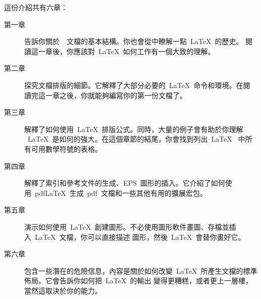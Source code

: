 \bigskip
\noindent 這份介紹共有六章：%
\begin{description}%
\item[第一章] 告訴你關於~\LaTeXe{}~文檔的基本結構。你也會從中瞭解一點~\LaTeX{}~的歷史。
              閱讀這一章後，你應該對~\LaTeX{}~如何工作有一個大致的理解。
\item[第二章] 探究文檔排版的細節。它解釋了大部分必要的~\LaTeX{}~命令和環境。在閱
              讀完這一章之後，你就能夠編寫你的第一份文檔了。%
\item[第三章] 解釋了如何使用~\LaTeX{}~排版公式。同時，大量的例子會有助於你理解
              ~\LaTeX{}~是如何的強大。在這個章節的結尾，你會找到列出~\LaTeX{}~
              中所有可用數學符號的表格。%
\item[第四章] 解釋了索引和參考文件的生成、EPS~圖形的插入。它介紹了如何使用~pdf\LaTeX{}~生成~pdf~文檔和一些其他有用的擴展宏包。%
\item[第五章] 演示如何使用~\LaTeX{}~創建圖形。不必使用圖形軟件畫圖、存檔並插入~\LaTeX{}~文檔，你可以直接描述
              圖形，然後~\LaTeX{}~會替你畫好它。
\item[第六章]
包含一些潛在的危險信息，內容是關於如何改變~\LaTeX{}~所產生文檔的標準佈局。它會告訴你如何把~\LaTeX{}~的輸出
變得更糟糕，或者更上一層樓，當然這取決於你的能力。
\end{description}%

